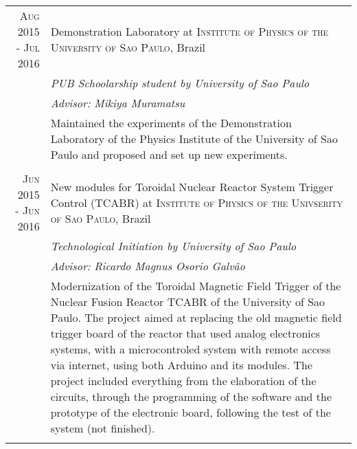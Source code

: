\documentclass[a4paper,10pt]{article} %
\begin{document}
\begin{tabular}{r|p{11cm}}

\textsc{Aug} 2015 - \textsc{Jul} 2016 &  Demonstration Laboratory at \textsc{Institute of Physics of the University of Sao Paulo}, Brazil \\
&\emph{PUB Schoolarship student by University of Sao Paulo}\\
&\emph{Advisor: Mikiya Muramatsu}\\
& \footnotesize{Maintained the experiments of the Demonstration Laboratory of the Physics Institute of the University of Sao Paulo and proposed and set up new experiments.}\\
\multicolumn{2}{c}{} \\


\textsc{Jun} 2015 - \textsc{Jun} 2016 &  New modules for Toroidal Nuclear Reactor System Trigger Control (TCABR) at \textsc{Institute of Physics of the Univserity of Sao Paulo}, Brazil \\
&\emph{Technological Initiation by University of Sao Paulo}\\
&\emph{Advisor: Ricardo Magnus Osorio Galvão}\\
& \footnotesize{Modernization of the Toroidal Magnetic Field Trigger of the Nuclear Fusion Reactor TCABR of the University of Sao Paulo. The project aimed at replacing the old magnetic field trigger board of the reactor that used analog electronics systems, with a microcontroled system with remote access via internet, using both Arduino and its modules. The project included everything from the elaboration of the circuits, through the programming of the software and the prototype of the electronic board, following the test of the system (not finished).}\\
\multicolumn{2}{c}{} \\



\end{tabular}
\end{document}
